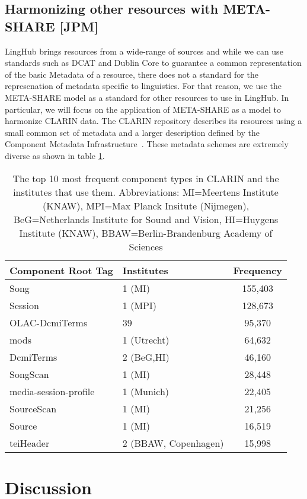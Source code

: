 \documentclass{llncs}
\begin{document}
{{\subsection{Harmonizing other resources with META-SHARE [JPM]}
\label{sec:harmonization}
LingHub brings resources from a wide-range of sources and while we can use
standards such as DCAT and Dublin Core to guarantee a common representation of the basic
Metadata of a resource, there does not a standard for the represenation of
metadata specific to linguistics. For that reason, we use the META-SHARE model
as a standard for other resources to use in LingHub. In particular, we will
focus on the application of META-SHARE as a model to harmonize CLARIN data. The
CLARIN repository describes its resources using a small common set of metadata
and a larger description defined by the Component Metadata
Infrastructure~\cite[CMDI]{broeder2012cmdi}. These metadata schemes are
extremely diverse as shown in table \ref{tab:clarin-types}.
\begin{table}
\begin{center}
\begin{tabular}{l|lc}
Component Root Tag & Institutes & Frequency \\
\hline
Song & 1 (MI) & 155,403 \\
Session & 1 (MPI) & 128,673 \\
OLAC-DcmiTerms & 39 & 95,370 \\
mods & 1 (Utrecht)& 64,632 \\
DcmiTerms & 2 (BeG,HI) & 46,160 \\
SongScan & 1 (MI) & 28,448 \\
media-session-profile & 1 (Munich) & 22,405 \\
SourceScan & 1 (MI) & 21,256 \\
Source & 1 (MI) & 16,519 \\
teiHeader & 2 (BBAW, Copenhagen) & 15,998 \\
\end{tabular}
\end{center}
\caption{\label{tab:clarin-types}The top 10 most frequent component types in
CLARIN and the institutes that use them. Abbreviations: MI=Meertens Institute (KNAW),
MPI=Max Planck Insitute (Nijmegen), BeG=Netherlands Institute for Sound and Vision,
HI=Huygens Institute (KNAW), BBAW=Berlin-Brandenburg Academy of Sciences}
\end{table}
\section{Discussion}
\label{sec:discussion}
}}
\end{document}

